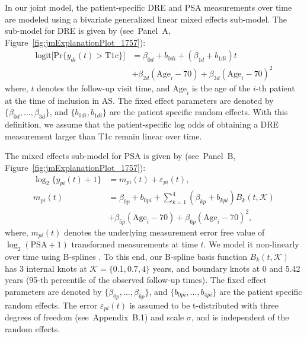 In our joint model, the patient-specific DRE and PSA measurements over time are modeled using a bivariate generalized linear mixed effects sub-model. The sub-model for DRE is given by (see~Panel~A, Figure~\ref{fig:jmExplanationPlot_1757}):
\begin{equation}
\label{eq:long_model_dre}
\begin{split}
    \mbox{logit} \big[\mbox{Pr}\{y_{di}(t) > \mbox{T1c}\}\big] &= \beta_{0d} + b_{0di} + (\beta_{1d} + b_{1di}) t\\
    &+ \beta_{2d} (\mbox{Age}_i-70) + \beta_{3d} (\mbox{Age}_i-70)^2
    \end{split}
\end{equation}
where, $t$ denotes the follow-up visit time, and $\mbox{Age}_i$ is the age of the ${i\mbox{-th}}$ patient at the time of inclusion in AS. The fixed effect parameters are denoted by ${\{\beta_{0d}, \ldots, \beta_{3d}\}}$, and ${\{b_{0di}, b_{1di}\}}$ are the patient specific random effects. With this definition, we assume that the patient-specific log odds of obtaining a DRE measurement larger than T1c remain linear over time. 

The mixed effects sub-model for PSA is given by (see~Panel~B, Figure~\ref{fig:jmExplanationPlot_1757}):
\begin{equation}
\label{eq:long_model_psa}
\begin{split}
    \log_2 \big\{y_{pi}(t) + 1\big\} &= m_{pi}(t) + \varepsilon_{pi}(t),\\
    m_{pi}(t) &= \beta_{0p} + b_{0pi} + \sum_{k=1}^4 (\beta_{kp} + b_{kpi})  B_k(t,\mathcal{K})\\ 
    &+ \beta_{5p} (\mbox{Age}_i-70) + \beta_{6p} (\mbox{Age}_i-70)^2,
    \end{split}
\end{equation}
where, $m_{pi}(t)$ denotes the underlying measurement error free value of $\log_2 (\mbox{PSA} + 1)$ transformed \citep{pearson1994mixed,lin2000latent} measurements at time $t$. We model it non-linearly over time using B-splines \citep{de1978practical}. To this end, our B-spline basis function $B_k(t, \mathcal{K})$ has 3 internal knots at $\mathcal{K} = \{0.1, 0.7, 4\}$ years, and boundary knots at 0 and 5.42 years (95-th percentile of the observed follow-up times). The fixed effect parameters are denoted by ${\{\beta_{0p},\ldots,\beta_{6p}\}}$, and ${\{b_{0pi}, \ldots, b_{4pi}\}}$ are the patient specific random effects. The error $\varepsilon_{pi}(t)$ is assumed to be t-distributed with three degrees of freedom (see~Appendix~B.1) and scale $\sigma$, and is independent of the random effects. 

